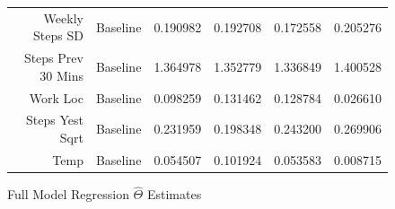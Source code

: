 \begin{figure}
\begin{tabular}{rl|rrrr}
Weekly Steps SD & Baseline    &   0.190982 &       0.192708 &       0.172558 &       0.205276 \\
Steps Prev 30 Mins & Baseline &   1.364978 &       1.352779 &       1.336849 &       1.400528 \\
Work Loc & Baseline           &   0.098259 &       0.131462 &       0.128784 &       0.026610 \\
Steps Yest Sqrt & Baseline    &   0.231959 &       0.198348 &       0.243200 &       0.269906 \\
Temp & Baseline               &   0.054507 &       0.101924 &       0.053583 &       0.008715 \\
\bottomrule
\end{tabular}

\caption{Full Model Regression $\hat{\Theta}$ Estimates}
\end{figure}

